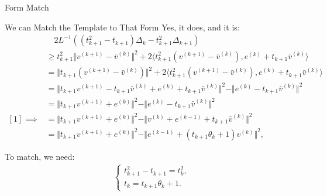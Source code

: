 \documentclass[11pt]{beamer}
\begin{document}
        \begin{frame}{Form Match}
            \begin{block}{We can Match the Template to That Form}
                Yes, it does, and it is: 
                {\scriptsize
                \begin{align*}
                    & \quad 2L^{-1}((t_{k + 1}^2 - t_{k + 1})\Delta_k - t_{k + 1}^2\Delta_{k + 1})
                    \\
                    & \ge  
                    t_{k + 1}^2\Vert v^{(k + 1)} - \bar v^{(k)}\Vert^2 + 
                    2\langle t_{k + 1}^2(v^{(k + 1)} - \bar v^{(k)}), e^{(k)} + t_{k + 1} \bar v^{(k)}\rangle
                    \\
                    &=
                    \Vert t_{k + 1} (v^{(k + 1)} - \bar v^{(k)}) \Vert^2 + 
                    2\langle t_{k + 1}^2(v^{(k + 1)} - \bar v^{(k)}), e^{(k)} + t_{k + 1}\bar v^{(k)}\rangle
                    \\
                    &=
                    \Vert t_{k+1} v^{(k + 1)} - t_{k + 1}\bar v^{(k)} + e^{(k)} + t_{k + 1}\bar v^{(k)}\Vert^2
                    - 
                    \Vert e^{(k)} - t_{k + 1} \bar v^{(k)}\Vert^2
                    \\
                    &=
                    \Vert 
                        t_{k+1} v^{(k + 1)} + e^{(k)}
                    \Vert^2
                    - 
                    \Vert e^{(k)} - t_{k + 1} \bar v^{(k)}\Vert^2
                    \\
                    [1]\implies
                    & = 
                    \Vert t_{k + 1}v^{(k + 1)} + e^{(k)}\Vert^2
                    - 
                    \Vert v^{(k)} + e^{(k - 1)} + t_{k + 1}\bar v^{(k)} \Vert^2
                    \\
                    & = 
                    \Vert t_{k + 1}v^{(k + 1)} + e^{(k)}\Vert^2
                    - 
                    \Vert e^{(k - 1)} + (t_{k + 1}\theta_k + 1) v^{(k)} \Vert^2, 
                    \tag{$\star \star$}
                \end{align*}
                }
            \end{block}
            To match, we need: 
                \begin{align*}
                    \begin{cases}
                        t^2_{k + 1} - t_{k + 1} = t_k^2,
                        \\
                        t_k = t_{k + 1}\theta_k + 1. 
                    \end{cases}
                    \tag{$\star **$}
                \end{align*}
        \end{frame}
\end{document}
